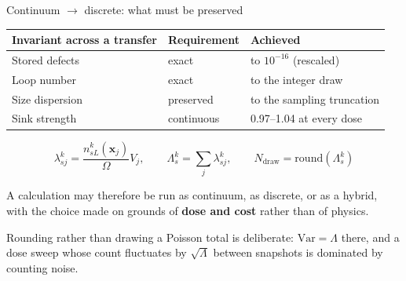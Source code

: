 \documentclass[aspectratio=169,10pt]{beamer}
\newcommand{\xv}{\bm{x}}
\newcommand{\foot}[1]{\par\vspace{1ex}%
  \begingroup\footnotesize\raggedright #1\par\endgroup}
\begin{document}
\begin{frame}{Continuum $\to$ discrete: what must be preserved}
\small
\begin{center}
\begin{tabular}{@{}lll@{}}
\toprule
Invariant across a transfer & Requirement & Achieved \\
\midrule
Stored defects & exact & to $10^{-16}$ (rescaled) \\
Loop number & exact & to the integer draw \\
Size dispersion & preserved & to the sampling truncation \\
Sink strength & continuous & 0.97--1.04 at every dose \\
\bottomrule
\end{tabular}
\end{center}
\[
  \lambda^k_{sj}=\frac{n^k_{sL}(\xv_j)}{\Omega}V_j,\qquad
  \Lambda^k_s=\sum_j\lambda^k_{sj},\qquad
  N_{\mathrm{draw}}=\mathrm{round}(\Lambda^k_s)
\]
\begin{block}{}
A calculation may therefore be run as continuum, as discrete, or as a hybrid,
with the choice made on grounds of \textbf{dose and cost} rather than of
physics.
\end{block}
\foot{Rounding rather than drawing a Poisson total is deliberate: $\mathrm{Var}
=\Lambda$ there, and a dose sweep whose count fluctuates by $\sqrt\Lambda$
between snapshots is dominated by counting noise.}
\end{frame}
\end{document}

